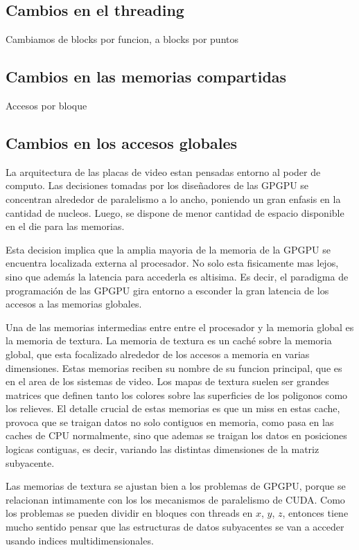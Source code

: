 \subsection{Cambios en el threading}
Cambiamos de blocks por funcion, a blocks por puntos
\subsection{Cambios en las memorias compartidas}
Accesos por bloque
\subsection{Cambios en los accesos globales}
La arquitectura de las placas de video estan pensadas entorno al poder de computo.
Las decisiones tomadas por los diseñadores de las GPGPU se concentran alrededor
de paralelismo a lo ancho, poniendo un gran enfasis en la cantidad de nucleos. Luego,
se dispone de menor cantidad de espacio disponible en el die para las memorias. 

Esta decision implica que la amplia mayoria de la memoria de la GPGPU se encuentra
localizada externa al procesador.  No solo esta fisicamente mas lejos, sino que
adem\'as la latencia para accederla es altisima. Es decir, el paradigma de
programaci\'on de las GPGPU gira entorno a esconder la gran latencia de los accesos
a las memorias globales.

Una de las memorias intermedias entre entre el procesador y la memoria global es
la memoria de textura. La memoria de textura es un cach\'e sobre la memoria global, 
que esta focalizado alrededor de los accesos a memoria en varias dimensiones.
Estas memorias reciben su nombre de su funcion principal, que es en el area de los
sistemas de video. Los mapas de textura suelen ser grandes matrices que definen
tanto los colores sobre las superficies de los poligonos como los relieves.
El detalle crucial de estas memorias es que un miss en estas cache, provoca
que se traigan datos no solo contiguos en memoria, como pasa en las caches de 
CPU normalmente, sino que ademas se traigan los datos en posiciones logicas contiguas,
es decir, variando las distintas dimensiones de la matriz subyacente. 

Las memorias de textura se ajustan bien a los problemas de GPGPU, porque se relacionan
intimamente con los los mecanismos de paralelismo de CUDA. Como los problemas se pueden
dividir en bloques con threads en $x$, $y$, $z$, entonces tiene mucho sentido pensar
que las estructuras de datos subyacentes se van a acceder usando indices multidimensionales.

